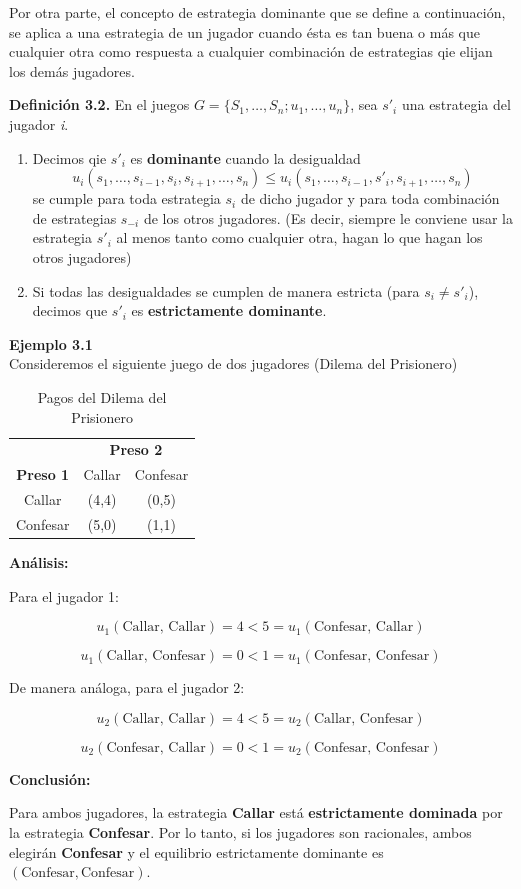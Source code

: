 \documentclass[12pt,a4paper,]{book}
\numberwithin{dummy}{section}
\theoremstyle{ocrenumbox}
\theoremstyle{blacknumex}
\theoremstyle{blacknumbox}
\theoremstyle{ocrenum}
\theoremstyle{ocrenum}
\begin{document}
Por otra parte, el concepto de estrategia dominante que se define a
continuación, se aplica a una estrategia de un jugador cuando ésta es
tan buena o más que cualquier otra como respuesta a cualquier
combinación de estrategias qie elijan los demás jugadores.

\textbf{Definición 3.2.} En el juegos
\(G = \{S_1,\ldots,S_n;u_1,\ldots,u_n\}\), sea \(s'_i\) una estrategia
del jugador \emph{i}.

\begin{enumerate}
\def\labelenumi{\alph{enumi})}
\item
  Decimos qie \(s'_i\) es \textbf{dominante} cuando la desigualdad
  \[u_i(s_1,\ldots,s_{i-1},s_i,s_{i+1},\ldots,s_n)\le u_i(s_1,\ldots,s_{i-1},s'_i,s_{i+1},\ldots,s_n)\]
  se cumple para toda estrategia \(s_i\) de dicho jugador y para toda
  combinación de estrategias \(s_{-i}\) de los otros jugadores. (Es
  decir, siempre le conviene usar la estrategia \(s'_i\) al menos tanto
  como cualquier otra, hagan lo que hagan los otros jugadores)
\item
  Si todas las desigualdades se cumplen de manera estricta (para
  \(s_i \neq s'_i\)), decimos que \(s'_i\) es \textbf{estrictamente
  dominante}.
\end{enumerate}

\begin{tcolorbox}[colback=blue!10]
\textbf{Ejemplo 3.1} \\

Consideremos el siguiente juego de dos jugadores (Dilema del Prisionero)

\begin{table}[H]
\centering
\begin{tabular}{c|cc}
 & \multicolumn{2}{c}{\textbf{Preso 2}} \\ 
\textbf{Preso 1} & Callar & Confesar \\ \hline
Callar & (4,4) & (0,5) \\
Confesar & (5,0) & (1,1)
\end{tabular}
\caption{Pagos del Dilema del Prisionero}
\label{tab:dilema_prisionero}
\end{table}

\textbf{Análisis:}  

Para el jugador 1:

\[
u_1(\text{Callar, Callar}) = 4 < 5 = u_1(\text{Confesar, Callar})
\]

\[
u_1(\text{Callar, Confesar}) = 0 < 1 = u_1(\text{Confesar, Confesar})
\]

De manera análoga, para el jugador 2:

\[
u_2(\text{Callar, Callar}) = 4 < 5 = u_2(\text{Callar, Confesar})
\]

\[
u_2(\text{Confesar, Callar}) = 0 < 1 = u_2(\text{Confesar, Confesar})
\]

\textbf{Conclusión:}  

Para ambos jugadores, la estrategia \textbf{Callar} está \textbf{estrictamente dominada} por la estrategia \textbf{Confesar}.  
Por lo tanto, si los jugadores son racionales, ambos elegirán \textbf{Confesar} y el equilibrio estrictamente dominante es \((\text{Confesar}, \text{Confesar})\).
\end{tcolorbox}
\end{document}
